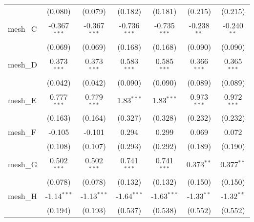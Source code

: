 \begin{tabular}{lcccccc}
                                                               & (0.080)        & (0.079)        & (0.182)        & (0.181)        & (0.215)        & (0.215)\\   
   mesh\_C                                                     & -0.367$^{***}$ & -0.367$^{***}$ & -0.736$^{***}$ & -0.735$^{***}$ & -0.238$^{**}$  & -0.240$^{**}$\\   
                                                               & (0.069)        & (0.069)        & (0.168)        & (0.168)        & (0.090)        & (0.090)\\   
   mesh\_D                                                     & 0.373$^{***}$  & 0.373$^{***}$  & 0.583$^{***}$  & 0.585$^{***}$  & 0.366$^{***}$  & 0.365$^{***}$\\   
                                                               & (0.042)        & (0.042)        & (0.090)        & (0.090)        & (0.089)        & (0.089)\\   
   mesh\_E                                                     & 0.777$^{***}$  & 0.779$^{***}$  & 1.83$^{***}$   & 1.83$^{***}$   & 0.973$^{***}$  & 0.972$^{***}$\\   
                                                               & (0.163)        & (0.164)        & (0.327)        & (0.328)        & (0.232)        & (0.232)\\   
   mesh\_F                                                     & -0.105         & -0.101         & 0.294          & 0.299          & 0.069          & 0.072\\   
                                                               & (0.108)        & (0.107)        & (0.293)        & (0.292)        & (0.189)        & (0.190)\\   
   mesh\_G                                                     & 0.502$^{***}$  & 0.502$^{***}$  & 0.741$^{***}$  & 0.741$^{***}$  & 0.373$^{**}$   & 0.377$^{**}$\\   
                                                               & (0.078)        & (0.078)        & (0.132)        & (0.132)        & (0.150)        & (0.150)\\   
   mesh\_H                                                     & -1.14$^{***}$  & -1.13$^{***}$  & -1.64$^{***}$  & -1.63$^{***}$  & -1.33$^{**}$   & -1.32$^{**}$\\   
                                                               & (0.194)        & (0.193)        & (0.537)        & (0.538)        & (0.552)        & (0.552)\\   

\end{tabular}
